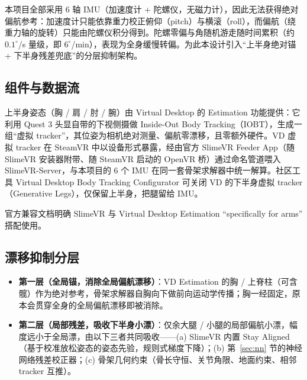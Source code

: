 \documentclass[scheme=plain,UTF8,11pt,a4paper]{ctexart}
\begin{document}
本项目全部采用 6 轴 IMU（加速度计 + 陀螺仪，无磁力计），因此无法获得绝对偏航参考：加速度计只能依靠重力校正俯仰（pitch）与横滚（roll），而偏航（绕重力轴的旋转）只能由陀螺仪积分得到。陀螺零偏与角随机游走随时间累积（约 $0.1^{\circ}$/s 量级，即 $6^{\circ}$/min），表现为全身缓慢转偏。为此本设计引入“上半身绝对锚 + 下半身残差兜底”的分层抑制架构。

\subsection{组件与数据流}

上半身姿态（胸 / 肩 / 肘 / 腕）由 Virtual Desktop 的 Estimation 功能提供：它利用 Quest 3 头显自带的下视侧摄做 Inside-Out Body Tracking（IOBT），生成一组“虚拟 tracker”，其位姿为相机绝对测量、偏航零漂移，且零额外硬件。VD 虚拟 tracker 在 SteamVR 中以设备形式暴露，经由官方 SlimeVR Feeder App（随 SlimeVR 安装器附带、随 SteamVR 启动的 OpenVR 桥）通过命名管道喂入 SlimeVR-Server，与本项目的 6 个 IMU 在同一套骨架求解器中统一解算。社区工具 Virtual Desktop Body Tracking Configurator 可关闭 VD 的下半身虚拟 tracker（Generative Legs），仅保留上半身，把腿留给 IMU。

官方兼容文档明确 SlimeVR 与 Virtual Desktop Estimation “specifically for arms” 搭配使用。

\subsection{漂移抑制分层}

\begin{itemize}
    \item \textbf{第一层（全局锚，消除全局偏航漂移）}：VD Estimation 的胸 / 上脊柱（可含髋）作为绝对参考，骨架求解器自胸向下做前向运动学传播；胸一经固定，原本会贯穿全身的全局偏航漂移即被消除。
    \item \textbf{第二层（局部残差，吸收下半身小漂）}：仅余大腿 / 小腿的局部偏航小漂，幅度远小于全局漂，由以下三者共同吸收——(a) SlimeVR 内置 Stay Aligned（基于校准放松姿态的姿态先验，规则式梯度下降）；(b) 第~\ref{sec:nn} 节的神经网络残差校正器；(c) 骨架几何约束（骨长守恒、关节角限、地面约束、相邻 tracker 互推）。
\end{itemize}
\end{document}
